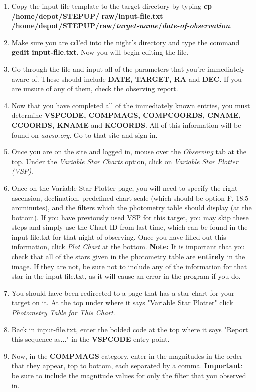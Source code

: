 \documentclass[11pt]{report}
\begin{document}
\begin{enumerate}
\item Copy the input file template to the target directory by typing {\bf cp /home/depot/STEPUP/} {\bf raw/input-file.txt /home/depot/STEPUP/raw/\emph{target-name}/\emph{date-of-observation}}. 
\item Make sure you are {\bf cd}'ed into the night's directory and type the command {\bf gedit input-file.txt}. Now you will begin editing the file.
\item Go through the file and input all of the parameters that you're immediately aware of. These should include {\bf DATE, TARGET, RA} and {\bf DEC}. If you are unsure of any of them, check the observing report.
\item Now that you have completed all of the immediately known entries, you must determine {\bf VSPCODE, COMPMAGS, COMPCOORDS, CNAME, CCOORDS, KNAME} and {\bf KCOORDS}. All of this information will be found on \emph{aavso.org}. Go to that site and sign in. 
\item Once you are on the site and logged in, mouse over the \emph{Observing} tab at the top. Under the \emph{Variable Star Charts} option, click on \emph{Variable Star Plotter (VSP)}. 
\item Once on the Variable Star Plotter page, you will need to specify the right ascension, declination, predefined chart scale (which should be option F, 18.5 arcminutes), and the filters which the photometry table should display (at the bottom). If you have previously used VSP for this target, you may skip these steps and simply use the Chart ID from last time, which can be found in the input-file.txt for that night of observing. Once you have filled out this information, click \emph{Plot Chart} at the bottom. {\bf Note:} It is important that you check that all of the stars given in the photometry table are {\bf entirely} in the image. If they are not, be sure not to include any of the information for that star in the input-file.txt, as it will cause an error in the program if you do. 
\item You should have been redirected to a page that has a star chart for your target on it. At the top under where it says "Variable Star Plotter" click \emph{Photometry Table for This Chart}.
\item Back in input-file.txt, enter the bolded code at the top where it says "Report this sequence as..." in the {\bf VSPCODE} entry point.
\item Now, in the {\bf COMPMAGS} category, enter in the magnitudes in the order that they appear, top to bottom, each separated by a comma. \textbf{Important}: be sure to include the magnitude values for only the filter that you observed in.

\end{enumerate}
\end{document}
